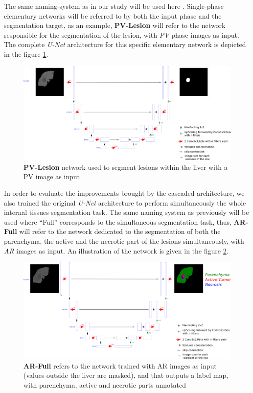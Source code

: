 \documentclass[]{article}
\newcommand{\pplfont}[1]{{\textbf{\fontfamily{ppl}\selectfont #1}}}
\begin{document}
	The same naming-system as in our study will be used
	here \cite{Ouhmich2019}. Single-phase elementary networks will be referred to by both the
	input phase and the segmentation target, as an example, \pplfont{PV-Lesion} will
	refer to the network responsible for the segmentation of the lesion,
	with \emph{PV} phase images as input. The complete \emph{U-Net}
	architecture for this specific elementary network is depicted in the figure \ref{CARS_PV_lesion_Fig}.
	
	\begin{figure}[th!]
		\centering
		\includegraphics[width=0.7\linewidth]{images/image16}
		\caption{\pplfont{PV-Lesion} network used to segment lesions within the liver with a PV image as input}
		\label{CARS_PV_lesion_Fig}
	\end{figure}
	
	
	In order to evaluate the improvements brought by the cascaded
	architecture, we also trained the original \emph{U-Net} architecture to
	perform simultaneously the whole internal tissues segmentation task. The
	same naming system as previously will be used where ``Full'' corresponds
	to the simultaneous segmentation task, thus, \pplfont{AR-Full} will refer to the
	network dedicated to the segmentation of both the parenchyma, the active
	and the necrotic part of the lesions simultaneously, with \emph{AR}
	images as input. An illustration of the network is given in the figure
	\ref{CARS_ArFull_Fig}.
	
	\begin{figure}[th!]
		\centering
		\includegraphics[width=0.7\linewidth]{images/image23}
		\caption{\pplfont{AR-Full} refers to the network trained with AR images as input (values outside the liver are masked), and that outputs a label map, with parenchyma, active and necrotic parts annotated}
		\label{CARS_ArFull_Fig}
	\end{figure}
	
\end{document}
